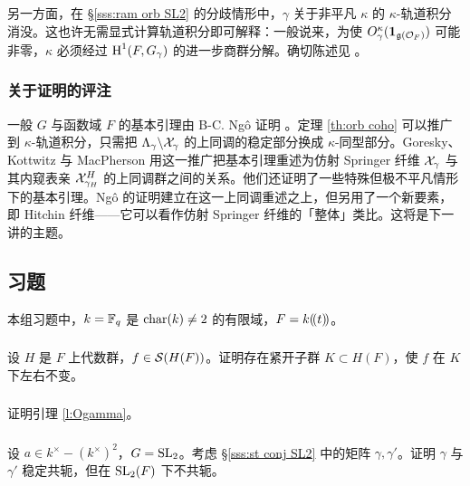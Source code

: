 另一方面，在 \S\ref{sss:ram orb SL2} 的分歧情形中，$\gamma$ 关于非平凡 $\kappa$ 的 $\kappa$-轨道积分消没。这也许无需显式计算轨道积分即可解释：一般说来，为使 $O^{\kappa}_{\gamma}(\mathbf{1}_{\mathfrak{g}(\mathcal{O}_{F})})$ 可能非零，$\kappa$ 必须经过 $\textup{H}^{1}({F,G_{\gamma}})$ 的进一步商群分解。确切陈述见 \cite[命题 8.2.7]{NgoFL}。

\subsubsection{关于证明的评注} 一般 $G$ 与函数域 $F$ 的基本引理由 B-C. Ng\^o 证明 \cite{NgoFL}。定理 \ref{th:orb coho} 可以推广到 $\kappa$-轨道积分，只需把 $\Lambda_{\gamma}\backslash\mathcal{X}_{\gamma}$ 的上同调的稳定部分换成 $\kappa$-同型部分。Goresky、Kottwitz 与 MacPherson \cite{GKM} 用这一推广把基本引理重述为仿射 Springer 纤维 $\mathcal{X}_{\gamma}$ 与其内窥表亲 $\mathcal{X}^{H}_{\gamma_{H}}$ 的上同调群之间的关系。他们还证明了一些特殊但极不平凡情形下的基本引理。Ng\^o 的证明建立在这一上同调重述之上，但另用了一个新要素，即 Hitchin 纤维——它可以看作仿射 Springer 纤维的「整体」类比。这将是下一讲的主题。

\subsection{习题}

本组习题中，$k=\mathbb{F}_{q}$ 是 $\textup{char}(k)\neq2$ 的有限域，$F=k(\!(t)\!)$。

\subsubsection{}\label{exIII:K inv} 设 $H$ 是 $F$ 上代数群，$f\in\mathcal{S}(H(F))$。证明存在紧开子群 $K\subset H(F)$，使 $f$ 在 $K$ 下左右不变。

\subsubsection{}\label{exIII:Ogamma} 证明引理 \ref{l:Ogamma}。

\subsubsection{}\label{exIII:stable conj} 设 $a\in k^{\times}-(k^{\times})^{2}$，$G=\textup{SL}_{2}$。考虑 \S\ref{sss:st conj SL2} 中的矩阵 $\gamma,\gamma'$。证明 $\gamma$ 与 $\gamma'$ 稳定共轭，但在 $\textup{SL}_{2}(F)$ 下不共轭。

